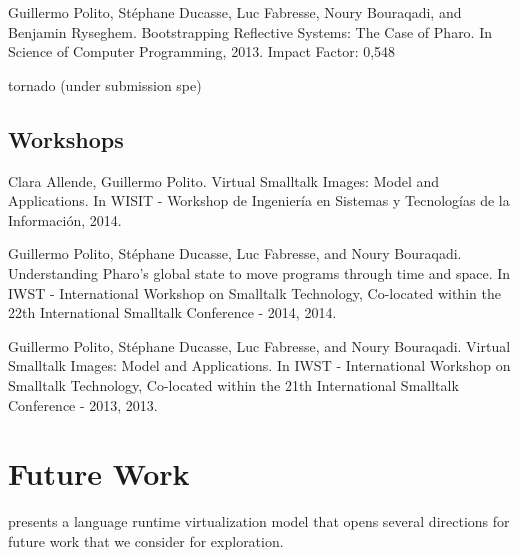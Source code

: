 Guillermo Polito, Stéphane Ducasse, Luc Fabresse, Noury Bouraqadi, and Benjamin Ryseghem. Bootstrapping Reflective Systems: The Case of Pharo. In Science of Computer Programming, 2013. Impact Factor: 0,548\newline



tornado (under submission spe)

\subsection{Workshops}

Clara Allende, Guillermo Polito. Virtual Smalltalk Images: Model and Applications. In WISIT - Workshop de Ingeniería en Sistemas y Tecnologías de la Información, 2014.

Guillermo Polito, Stéphane Ducasse, Luc Fabresse, and Noury Bouraqadi. Understanding Pharo’s global state to move programs through time and space. In IWST - International Workshop on Smalltalk Technology, Co-located within the 22th International Smalltalk Conference - 2014, 2014.

Guillermo Polito, Stéphane Ducasse, Luc Fabresse, and Noury Bouraqadi. Virtual Smalltalk Images: Model and Applications. In IWST - International Workshop on Smalltalk Technology, Co-located within the 21th International Smalltalk Conference - 2013, 2013.

\section{Future Work}

\Vtt presents a language runtime virtualization model that opens several directions for future work that we consider for exploration.

